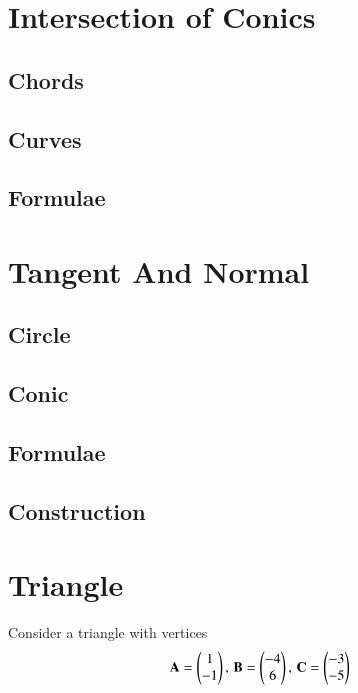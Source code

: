 \documentclass[journal]{IEEEtran}
\begin{document}
\section{Intersection of Conics}
\subsection{Chords}

\subsection{Curves}

\subsection{Formulae}


\newpage
\section{Tangent And Normal}
\subsection{Circle}

\subsection{Conic}

\subsection{Formulae}

\subsection{Construction}

%
\appendices
\section{Triangle}
Consider a triangle with vertices
		\begin{align}
			\label{eq:tri-pts}
			\mathbf{A} = \begin{pmatrix}1 \\ -1\end{pmatrix},\,
			\mathbf{B} = \begin{pmatrix}-4 \\ 6\end{pmatrix},\,
			\mathbf{C} = \begin{pmatrix}-3 \\ -5\end{pmatrix}
		\end{align}
\end{document}
